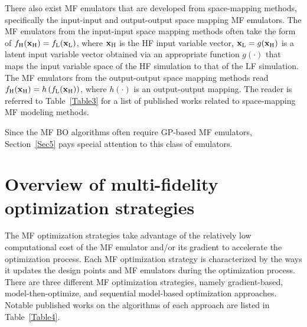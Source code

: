 \documentclass[iicol,sn-basic]{sn-jnl}%
\theoremstyle{thmstyleone}%
\theoremstyle{thmstyletwo}
\theoremstyle{thmstylethree}
\begin{document}
\begin{linenumbers}
There also exist MF emulators that are developed from space-mapping methods, specifically the input-input and output-output space mapping MF emulators.
The MF emulators from the input-input space mapping methods often take the form of $f_\text{H}({\bf x}_\text{H})=f_\text{L}({\bf x}_\text{L})$, where ${\bf x}_\text{H}$ is the HF input variable vector, ${\bf x}_\text{L}=g({\bf x}_\text{H})$ is a latent input variable vector obtained via an appropriate function $g(\cdot)$ that maps the input variable space of the HF simulation to that of the LF simulation. 
The MF emulators from the output-output space mapping methods read $f_\text{H}({\bf x}_\text{H})=h\left(f_\text{L}({\bf x}_\text{H})\right)$, where  $h(\cdot)$ is an output-output mapping.
The reader is referred to Table~\ref{Table3} for a list of published works related to space-mapping MF modeling methods.

Since the MF BO algorithms often require GP-based MF emulators, Section~\ref{Sec5} pays special attention to this class of emulators.

\section{Overview of multi-fidelity optimization strategies}\label{Sec4}

The MF optimization strategies take advantage of the relatively low computational cost of the MF emulator and/or its gradient to accelerate the optimization process.
Each MF optimization strategy is characterized by the ways it updates the design points and MF emulators during the optimization process.
There are three different MF optimization strategies, namely gradient-based, model-then-optimize, and sequential model-based optimization approaches.
Notable published works on the algorithms of each approach are listed in Table~\ref{Table4}.


\end{linenumbers}
\end{document}
